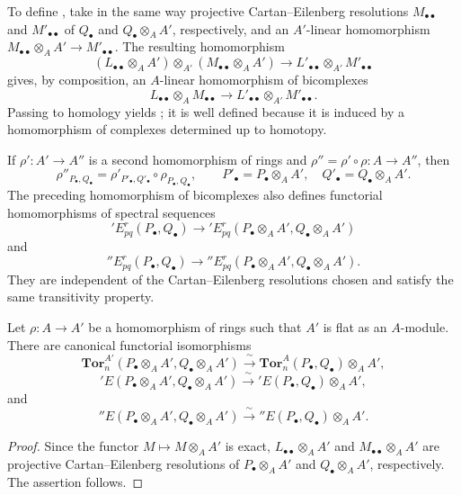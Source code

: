 \begin{env}[6.3.8]
To define , take in the same way projective
Cartan--Eilenberg resolutions $M_{\bullet\bullet}$ and
$M'_{\bullet\bullet}$ of $Q_\bullet$ and
$Q_\bullet\otimes_AA'$, respectively, and an $A'$-linear
homomorphism
$M_{\bullet\bullet}\otimes_AA'\longrightarrow M'_{\bullet\bullet}$.
The resulting homomorphism
\[
  (L_{\bullet\bullet}\otimes_AA')
  \otimes_{A'}
  (M_{\bullet\bullet}\otimes_AA')
  \longrightarrow
  L'_{\bullet\bullet}\otimes_{A'}M'_{\bullet\bullet}
\]
gives, by composition, an $A$-linear homomorphism of bicomplexes
\[
  L_{\bullet\bullet}\otimes_AM_{\bullet\bullet}
  \longrightarrow
  L'_{\bullet\bullet}\otimes_{A'}M'_{\bullet\bullet}.
\]
Passing to homology yields ; it is well defined
because it is induced by a homomorphism of complexes determined up
to homotopy.

If $\rho':A'\longrightarrow A''$ is a second homomorphism of rings
and $\rho''=\rho'\circ\rho:A\longrightarrow A''$, then
\[
  \rho''_{P_\bullet,Q_\bullet}
  =
  \rho'_{P'_\bullet,Q'_\bullet}
  \circ
  \rho_{P_\bullet,Q_\bullet},
  \qquad
  P'_\bullet=P_\bullet\otimes_AA',
  \quad
  Q'_\bullet=Q_\bullet\otimes_AA'.
\]
The preceding homomorphism of bicomplexes also defines functorial
homomorphisms of spectral sequences
\[
  'E_{pq}^r(P_\bullet,Q_\bullet)
  \longrightarrow
  'E_{pq}^r(P_\bullet\otimes_AA',Q_\bullet\otimes_AA')
\]
and
\[
  ''E_{pq}^r(P_\bullet,Q_\bullet)
  \longrightarrow
  ''E_{pq}^r(P_\bullet\otimes_AA',Q_\bullet\otimes_AA').
\]
They are independent of the Cartan--Eilenberg resolutions chosen
and satisfy the same transitivity property.
\end{env}

\begin{proposition}[6.3.9]
\label{III.6.3.9}
Let $\rho:A\longrightarrow A'$ be a homomorphism of rings such that
$A'$ is flat as an $A$-module.  There are canonical functorial
isomorphisms
\[
  \mathbf{Tor}_n^{A'}
  (P_\bullet\otimes_AA',Q_\bullet\otimes_AA')
  \xrightarrow{\ \sim\ }
  \mathbf{Tor}_n^A(P_\bullet,Q_\bullet)\otimes_AA',
  \tag{6.3.9.1}\label{III.6.3.9.1}
\]
\[
  'E(P_\bullet\otimes_AA',Q_\bullet\otimes_AA')
  \xrightarrow{\ \sim\ }
  'E(P_\bullet,Q_\bullet)\otimes_AA',
  \tag{6.3.9.2}\label{III.6.3.9.2}
\]
and
\[
  ''E(P_\bullet\otimes_AA',Q_\bullet\otimes_AA')
  \xrightarrow{\ \sim\ }
  ''E(P_\bullet,Q_\bullet)\otimes_AA'.
  \tag{6.3.9.3}\label{III.6.3.9.3}
\]
\end{proposition}

\begin{proof}
Since the functor $M\longmapsto M\otimes_AA'$ is exact,
$L_{\bullet\bullet}\otimes_AA'$ and
$M_{\bullet\bullet}\otimes_AA'$ are projective
Cartan--Eilenberg resolutions of $P_\bullet\otimes_AA'$ and
$Q_\bullet\otimes_AA'$, respectively.  The assertion follows.
\end{proof}

